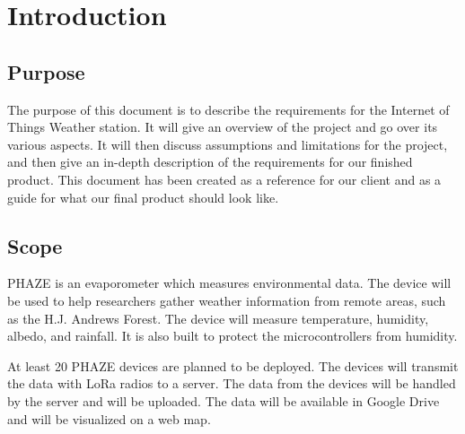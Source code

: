 \documentclass[onecolumn, draftclsnofoot,10pt, compsoc]{IEEEtran}
\begin{document}
\begin{versionhistory}
\end{versionhistory}

\section{Introduction}
\subsection{Purpose}
The purpose of this document is to describe the requirements for the Internet of Things Weather station. It will give an overview of the project and go over its various aspects. It will then discuss assumptions and limitations for the project, and then give an in-depth description of the requirements for our finished product. This document has been created as a reference for our client and as a guide for what our final product should look like.
\subsection{Scope}
PHAZE is an evaporometer which measures environmental data. The device will be used to help researchers gather weather information from remote areas, such as the H.J. Andrews Forest. The device will measure temperature, humidity, albedo, and rainfall. It is also built to protect the microcontrollers from humidity. 


At least 20 PHAZE devices are planned to be deployed. The devices will transmit the data with LoRa radios to a server. The data from the devices will be handled by the server and will be uploaded. The data will be available in Google Drive and will be visualized on a web map. 
\end{document}
